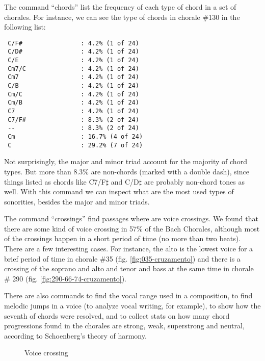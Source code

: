 The command ``chords'' list the frequency of each type of chord in a
set of chorales. For instance, we can see the type of chords in
chorale \#130 in the following list:

\begin{verbatim}
 C/F#                : 4.2% (1 of 24)
 C/D#                : 4.2% (1 of 24)
 C/E                 : 4.2% (1 of 24)
 Cm7/C               : 4.2% (1 of 24)
 Cm7                 : 4.2% (1 of 24)
 C/B                 : 4.2% (1 of 24)
 Cm/C                : 4.2% (1 of 24)
 Cm/B                : 4.2% (1 of 24)
 C7                  : 4.2% (1 of 24)
 C7/F#               : 8.3% (2 of 24)
 --                  : 8.3% (2 of 24)
 Cm                  : 16.7% (4 of 24)
 C                   : 29.2% (7 of 24)
\end{verbatim}

Not surprisingly, the major and minor triad account for the majority
of chord types. But more than 8.3\% are non-chords (marked with a
double dash), since things listed as chords like C7/F$\sharp$ and
C/D$\sharp$ are probably non-chord tones as well. With this command we
can inspect what are the most used types of sonorities, besides the
major and minor triads.

The command ``crossings'' find passages where are voice crossings. We
found that there are some kind of voice crossing in 57\% of the Bach
Chorales, although most of the crossings happen in a short period of
time (no more than two beats). There are a few interesting cases. For
instance, the alto is the lowest voice for a brief period of time in
chorale \#35 (fig. \ref{fig:035-cruzamento}) and there is a crossing
of the soprano and alto and tenor and bass at the same time in chorale
\# 290 (fig. \ref{fig:290-66-74-cruzamento}).

There are also commands to find the vocal range used in a composition,
to find melodic jumps in a voice (to analyze vocal writing, for
example), to show how the seventh of chords were resolved, and to
collect stats on how many chord progressions found in the chorales are
strong, weak, superstrong and neutral, according to Schoenberg's
theory of harmony.

\begin{figure}[!h]
  \centering
  \caption{Voice crossing}
  \label{fig:coral-003}
\end{figure}

